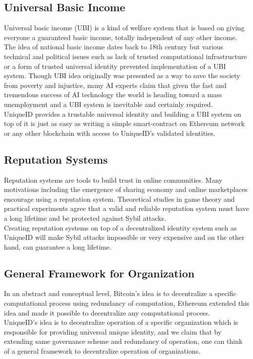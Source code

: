 \documentclass{article}
\begin{document}
\subsection{Universal Basic Income}
Universal basic income (UBI) is a kind of welfare system that is based on giving everyone a guaranteed basic income, totally independent of any other income. The idea of national basic income dates back to 18th century but various technical and political issues such as lack of trusted computational infrastructure or a form of trusted universal identity prevented implementation of a UBI system. Though UBI idea originally was presented as a way to save the society from poverty and injustice, many AI experts claim that given the fast and tremendous success of AI technology the world is heading toward a mass unemployment and a UBI system is inevitable and certainly required.\\
UniqueID provides a trustable universal identity and building a UBI system on top of it is just as easy as writing a simple smart-contract on Ethereum network or any other blockchain with access to UniqueID's validated identities. 

\subsection{Reputation Systems}
Reputation systems are tools to build trust in online communities. Many motivations including the emergence of sharing economy and online marketplaces encourage using a reputation system. Theoretical studies in game theory and practical experiments agree that a valid and reliable reputation system must have a long lifetime and be protected against Sybil attacks. \\
Creating reputation systems on top of a decentralized identity system such as UniqueID will make Sybil attacks impossible or very expensive and on the other hand, can guarantee a long lifetime.

\subsection{General Framework for Organization}
In an abstract and conceptual level, Bitcoin's idea is to decentralize a specific computational process using redundancy of computation, Ethereum extended this idea and made it possible to decentralize any computational process.\\ UniqueID's idea is to decentralize operation of a specific organization which is responsible for providing universal unique identity, and we claim that by extending same governance scheme and redundancy of operation, one can think of a general framework to decentralize operation of organizations. 
\end{document}
